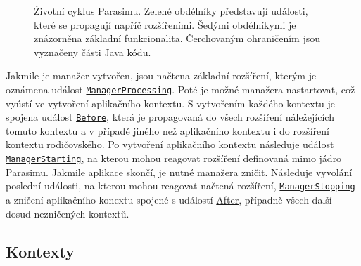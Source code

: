 \begin{figure}[h!]
\begin{center}
{}
\end{center}
\caption{Životní cyklus Parasimu. Zelené obdélníky představují události, které se propagují napříč rozšířeními.
Šedými obdélníkymi je znázorněna základní funkcionalita. Čerchovaným ohraničením jsou vyznačeny části Java kódu.}
\label{figure:parasim:lifecycle}
\end{figure}

Jakmile je manažer vytvořen,
jsou načtena zá\-klad\-ní rozšíření, kterým je oznámena událost \href{https://github.com/sybila/parasim/blob/2.0.0.Final/core/src/main/java/org/sybila/parasim/core/event/ManagerProcessing.java}{\texttt{ManagerProcessing}}.
Poté je možné manažera nastartovat, což vyústí ve vytvoření aplikačního kontextu.
S vytvořením každého kontextu je spojena událost \href{https://github.com/sybila/parasim/blob/2.0.0.Final/core/src/main/java/org/sybila/parasim/core/event/Before.java}{\texttt{Before}}, která je propagovaná
do všech roz\-ší\-ře\-ní náležejících tomuto kontextu a v případě jiného než
aplikačního kontextu i do rozšíření kontextu rodičovského.
Po vytvoření aplikačního kontextu následuje událost \href{https://github.com/sybila/parasim/blob/2.0.0.Final/core/src/main/java/org/sybila/parasim/core/event/ManagerStarted.java}{\texttt{ManagerStarting}},
na kterou mohou reagovat rozšíření definovaná mimo jádro Parasimu. Jakmile aplikace skončí,
je nutné ma\-na\-že\-ra zničit. Následuje vyvolání poslední u\-dá\-los\-ti, na kterou mohou reagovat načtená rozšíření, \href{https://github.com/sybila/parasim/blob/2.0.0.Final/core/src/main/java/org/sybila/parasim/core/event/ManagerStopping.java}{\texttt{ManagerStopping}}
a zničení aplikačního konextu spojené s událostí \href{https://github.com/sybila/parasim/blob/2.0.0.Final/core/src/main/java/org/sybila/parasim/core/event/After.java}{After}, případně všech další dosud nezničených kontextů.

\subsection{Kontexty}

